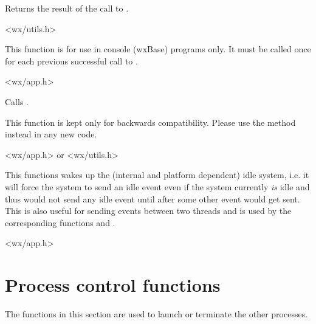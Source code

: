 Returns the result of the call to .


<wx/utils.h>


\label{wxuninitialize}


This function is for use in console (wxBase) programs only. It must be called
once for each previous successful call to .


<wx/app.h>


\label{wxyield}


Calls .

This function is kept only for backwards compatibility. Please use
the  method instead in any new code.


<wx/app.h> or <wx/utils.h>


\label{wxwakeupidle}


This functions wakes up the (internal and platform dependent) idle system, i.e. it
will force the system to send an idle event even if the system currently {\it is}
 idle and thus would not send any idle event until after some other event would get
sent. This is also useful for sending events between two threads and is used by
the corresponding functions  and
.


<wx/app.h>



\section{Process control functions}\label{processfunctions}

The functions in this section are used to launch or terminate the other
processes.


\label{wxexecute}


